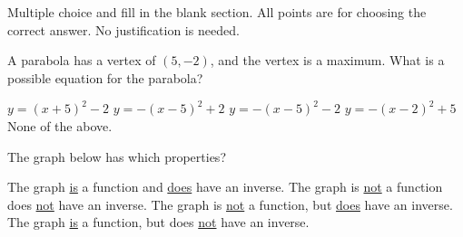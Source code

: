 \documentclass[addpoints,12pt]{exam}
\newcommand{\chooseone}{{\Large$\Circle$\ \ }}
\begin{document}
Multiple choice and fill in the blank section. All points are for choosing the correct answer. No justification is needed.
\begin{questions} 


\question[3] A parabola has a vertex of $(5,-2)$, and the vertex is a maximum. What is a possible equation for the parabola?
\begin{checkboxes}

    \choice $y=(x+5)^2-2$
    \choice $y=-(x-5)^2+2$
        \choice $y=-(x-5)^2-2$
    \choice $y=-(x-2)^2+5$
    \choice None of the above.
\end{checkboxes}

\question[3] The graph below has which properties?

\begin{checkboxes}
    \choice The graph \underline{is} a function and \underline{does} have an inverse.
    \choice The graph is \underline{not} a function does \underline{not} have an inverse.
    \choice The graph is \underline{not} a function, but \underline{does} have an inverse.
    \choice The graph \underline{is} a function, but does \underline{not} have an inverse.


\end{checkboxes}
\end{questions}
\end{document}
